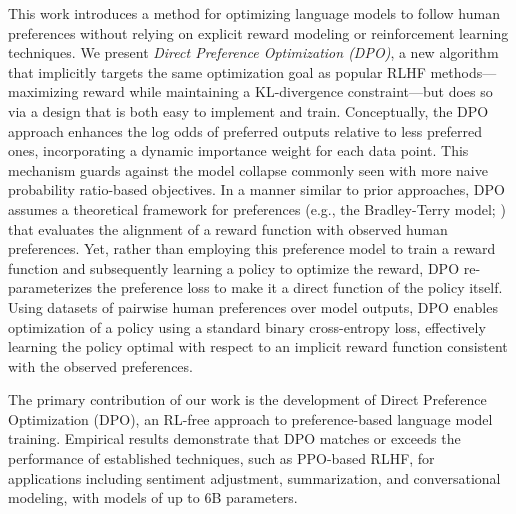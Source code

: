 This work introduces a method for optimizing language models to follow human preferences without relying on explicit reward modeling or reinforcement learning techniques. We present \textit{{Direct Preference Optimization} (DPO)}, a new algorithm that implicitly targets the same optimization goal as popular RLHF methods—maximizing reward while maintaining a KL-divergence constraint—but does so via a design that is both easy to implement and train. Conceptually, the DPO approach enhances the log odds of preferred outputs relative to less preferred ones, incorporating a dynamic importance weight for each data point. This mechanism guards against the model collapse commonly seen with more naive probability ratio-based objectives. In a manner similar to prior approaches, DPO assumes a theoretical framework for preferences (e.g., the Bradley-Terry model; \cite{bradley1952rankanalysis}) that evaluates the alignment of a reward function with observed human preferences. Yet, rather than employing this preference model to train a reward function and subsequently learning a policy to optimize the reward, DPO re-parameterizes the preference loss to make it a direct function of the policy itself. Using datasets of pairwise human preferences over model outputs, DPO enables optimization of a policy using a standard binary cross-entropy loss, effectively learning the policy optimal with respect to an implicit reward function consistent with the observed preferences.

The primary contribution of our work is the development of Direct Preference Optimization (DPO), an RL-free approach to preference-based language model training. Empirical results demonstrate that DPO matches or exceeds the performance of established techniques, such as PPO-based RLHF, for applications including sentiment adjustment, summarization, and conversational modeling, with models of up to 6B parameters.

